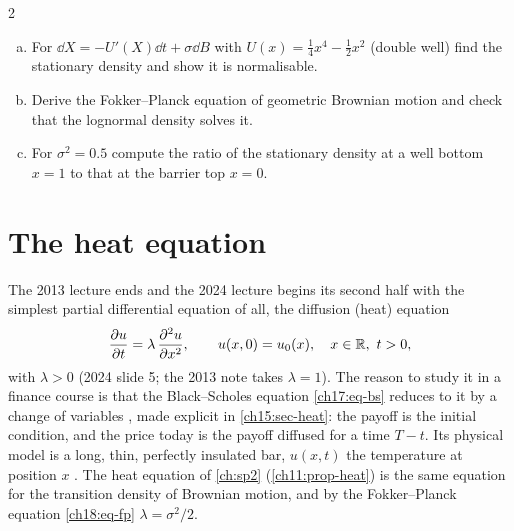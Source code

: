 \begin{paracol}{2}
\begin{exercise}\label{ch18:ex-fp}
\leavevmode
\begin{enumerate}[(a)]
  \item For $\dd X=-U'(X)\dd t+\sigma\dd B$ with $U(x)=\tfrac14x^4-\tfrac12x^2$ (double well) find the stationary density and show it is normalisable.
  \item Derive the Fokker--Planck equation of geometric Brownian motion and check that the lognormal density solves it.
  \item For $\sigma^2=0.5$ compute the ratio of the stationary density at a well bottom $x=1$ to that at the barrier top $x=0$.
\end{enumerate}
\end{exercise}

\section{The heat equation}\label{ch18:sec-heat}

The 2013 lecture ends and the 2024 lecture begins its second half with the simplest partial differential equation of all, the diffusion (heat) equation 
\begin{equation}\label{ch18:eq-heat}
  \frac{\partial u}{\partial t}=\lambda\,\frac{\partial^2u}{\partial x^2},\qquad u(x,0)=u_0(x),\quad x\in\mathbb{R},\ t>0 ,
\end{equation}
with $\lambda>0$ (2024 slide 5; the 2013 note takes $\lambda=1$). The reason to study it in a finance course is that the Black--Scholes equation \eqref{ch17:eq-bs} reduces to it by a change of variables , made explicit in \cref{ch15:sec-heat}: the payoff is the initial condition, and the price today is the payoff diffused for a time $T-t$. Its physical model is a long, thin, perfectly insulated bar, $u(x,t)$ the temperature at position $x$ . The heat equation of \cref{ch:sp2} (\cref{ch11:prop-heat}) is the same equation for the transition density of Brownian motion, and by the Fokker--Planck equation \eqref{ch18:eq-fp} $\lambda=\sigma^2/2$.


\end{paracol}
